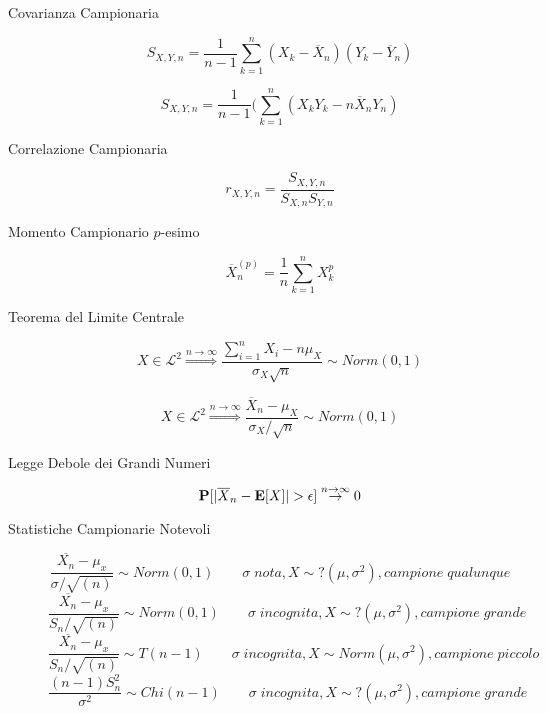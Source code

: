 \begin{description}
	\item[Covarianza Campionaria]
		\begin{equation}
		S_{X,Y,n}=\frac{1}{n-1}\sum_{k=1}^{n}(X_{k}-\overline{X}_{n})(Y_{k}-\overline{Y}_{n})
		\end{equation}
		
		\begin{equation}
		S_{X,Y,n}=\frac{1}{n-1}(\sum_{k=1}^{n}(X_{k}Y_{k}-n\overline{X}_{n}Y_{n})
		\end{equation}
	
	\item[Correlazione Campionaria]
		\begin{equation}
		r_{X,Y,n} = \frac{S_{X,Y,n}}{S_{X,n}S_{Y,n}}
		\end{equation}
	
	\item[Momento Campionario $p$-esimo]
		\begin{equation}
		\overline{X}_{n}^{(p)} = \frac{1}{n}\sum_{k=1}^{n}X_{k}^{p}
		\end{equation}
	
	\item[Teorema del Limite Centrale]
		\begin{equation}
		X\in\mathcal{L}^{2}
		\overset{n\rightarrow\infty}{\Rightarrow}
		\frac{\sum_{i=1}^{n} X_{i}-n\mu_{X}}{\sigma_{X}\sqrt{n}} \sim Norm(0,1)
		\end{equation}
		
		\begin{equation}
		X\in\mathcal{L}^{2}
		\overset{n\rightarrow\infty}{\Rightarrow}
		\frac{\overline{X}_{n}-\mu_{X}}{\sigma_{X}/\sqrt{n}} \sim Norm(0,1)
		\end{equation}
	
	\item[Legge Debole dei Grandi Numeri]
		\begin{equation}
		\mathbf{P}[|\overline{X}_{n}-\mathbf{E}[X]| > \epsilon] \overset{n\rightarrow\infty}{\rightarrow}0
		\end{equation}
	
	\item[Statistiche Campionarie Notevoli]
		\begin{equation}
		\frac{\overline{X_{n}}-\mu_{x}}{\sigma / \sqrt{(n)}} \sim Norm(0,1)
		\qquad
		\sigma\;nota,X\sim?(\mu,\sigma^{2}),campione\;qualunque
		\end{equation}
		\begin{equation}
		\frac{\overline{X_{n}}-\mu_{x}}{S_{n}/\sqrt{(n)}} \sim Norm(0,1)
		\qquad
		\sigma\;incognita,X\sim?(\mu,\sigma^{2}),campione\;grande
		\end{equation}
		\begin{equation}
		\frac{\overline{X_{n}}-\mu_{x}}{S_{n}/\sqrt{(n)}} \sim T(n-1)
		\qquad
		\sigma\;incognita,X\sim Norm(\mu,\sigma^{2}),campione\;piccolo
		\end{equation}
		\begin{equation}
		\frac{(n-1)S_{n}^{2}}{\sigma^{2}} \sim Chi(n-1)
		\qquad
		\sigma\;incognita,X\sim ?(\mu,\sigma^{2}),campione\;grande
		\end{equation}	
\end{description}
\newpage

